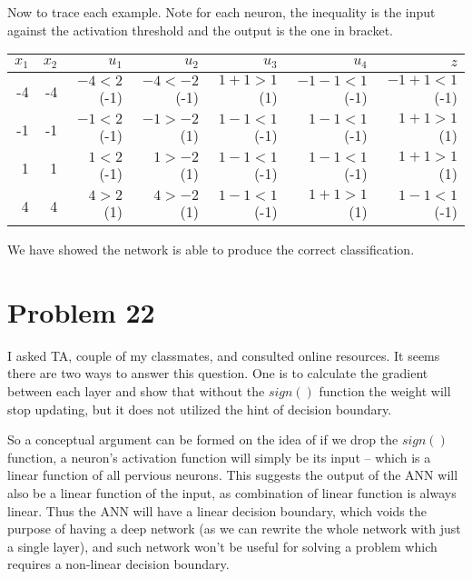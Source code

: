 \documentclass[12pt]{article}
\begin{document}
Now to trace each example. Note for each neuron, the inequality is the input against the activation threshold and the output is the one in bracket.
\begin{table}[H]
\centering
    \begin{tabular}{|rr|rrrr|r|}
        \hline
        $x_1$ & $x_2$ & $u_1$ & $u_2$ & $u_3$ & $u_4$ & $z$ \\
        \hline
        -4 & -4 & $-4<2$ (-1) & $-4< -2$ \ (-1) & $1 + 1 > 1$ \ (1) & $-1 - 1 < 1$ \ (-1) & $-1 + 1 < 1$ \ (-1) \\
        -1 & -1 & $-1<2$ \ (-1) &$-1> -2$ \ (1)  & $1 - 1 < 1$ \ (-1) & $1 - 1 < 1$ \ (-1) & $1 + 1 > 1$ \ (1) \\
        1 & 1 &  $1<2$ \ (-1) &  $1>-2$ \ (1)& $1 - 1 < 1$ \ (-1) & $1 - 1 < 1$ \ (-1) & $1 + 1 > 1$ \ (1) \\
        4 & 4 & $4>2$ (1) & $4>-2$ \ (1) & $1 - 1 < 1$ \ (-1) & $1 + 1 > 1$ \ (1) & $1 - 1 < 1$ \ (-1) \\
        \hline
    \end{tabular}
\end{table}

We have showed the network is able to produce the correct classification.


\section{Problem 22}

I asked TA, couple of my classmates, and consulted online resources. It seems there are two ways to answer this question. One is to calculate the gradient between each layer and show that without the $sign()$ function the weight will stop updating, but it does not utilized the hint of decision boundary.\newline

So a conceptual argument can be formed on the idea of if we drop the $sign()$ function, a neuron's activation function will simply be its input -- which is a linear function of all pervious neurons. This suggests the output of the ANN will also be a linear function of the input, as combination of linear function is always linear. Thus the ANN will have a linear decision boundary, which voids the purpose of having a deep network (as we can rewrite the whole network with just a single layer), and such network won't be useful for solving a problem which requires a non-linear decision boundary.\newline
\end{document}
